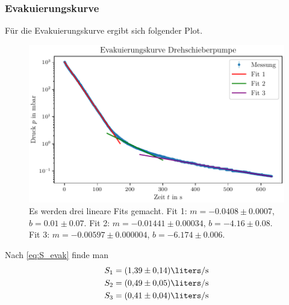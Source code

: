 \subsubsection{Evakuierungskurve}

Für die Evakuierungskurve ergibt sich folgender Plot.

\begin{figure}[H]
    \centering
    \includegraphics[width=\textwidth]{plots/DP_Evakuierungskurve.pdf}
    \caption{Es werden drei lineare Fits gemacht. Fit 1: $m = \num{-0.0408} \pm \num{0.0007}$, $b = \num{0.01} \pm \num{0.07}$. Fit 2: $m = \num{-0.01441} \pm \num{0.00034}$, $b = \num{-4.16} \pm \num{0.08}$. Fit 3: $m = \num{-0.00597} \pm \num{0.000004}$, $b = \num{-6.174} \pm \num{0.006}$.}
    \label{fig:DP_evak}
\end{figure}

Nach \eqref{eq:S_evak} finde man
\begin{align}
    S_1 &= (\num{1.39} \pm \num{0.14}) \si{\liters\per\second} \\
    S_2 &= (\num{0.49} \pm \num{0.05}) \si{\liters\per\second} \\
    S_3 &= (\num{0.41} \pm \num{0.04}) \si{\liters\per\second} \\
\end{align}